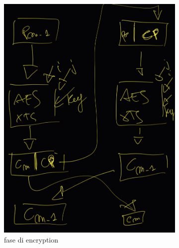 \documentclass[11pt, oneside]{article}   	%
\begin{document}
\begin{figure}[H]
\begin{subfigure}[h]{0.4\linewidth}
\includegraphics[width=\linewidth]{cpo}
\caption*{fase di encryption}
\end{subfigure}
\hfill
\begin{subfigure}[h]{0.4\linewidth}

\end{subfigure}
\end{figure}
\end{document}
